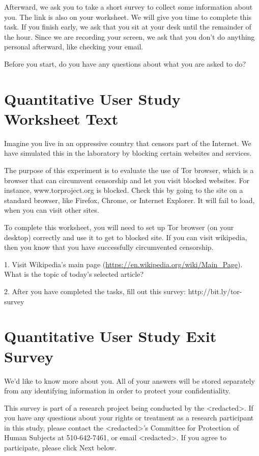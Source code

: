 \documentclass[USenglish,oneside,twocolumn]{article}
\begin{document}
Afterward, we ask you to take a short survey to collect some information about you. The link is also on your worksheet.
We will give you time to complete this task. If you finish early, we ask that you sit at your desk until the remainder of the hour. Since we are recording your screen, we ask that you don't do anything personal afterward, like checking your email.

Before you start, do you have any questions about what you are asked to do? 

\section{Quantitative User Study Worksheet Text} 
\label{summative-worksheet}
Imagine you live in an oppressive country that censors part of the Internet. We have simulated this in the laboratory by blocking certain websites and services.

The purpose of this experiment is to evaluate the use of Tor browser, which is a browser that can circumvent censorship and let you visit blocked websites. For instance, www.torproject.org is blocked. Check this by going to the site on a standard browser, like Firefox, Chrome, or Internet Explorer. It will fail to load, when you can visit other sites.

To complete this worksheet, you will need to set up Tor browser (on your desktop) correctly and use it to get to blocked site. If you can visit wikipedia, then you know that you have successfully circumvented censorship.

1. Visit Wikipedia’s main page (\url{https://en.wikipedia.org/wiki/Main\_Page}). What is the topic of today’s selected article? 

2. After you have completed the tasks, fill out this survey: http://bit.ly/tor-survey 


\section{Quantitative User Study Exit Survey} 
\label{quantitative-exit-survey}
We'd like to know more about you.  All of your answers will be stored separately from any identifying information in order to protect your confidentiality.

This survey is part of a research project being conducted by the <redacted>. %
If you have any questions about your rights or treatment as a research participant in this study, please contact the <redacted>'s %
Committee for Protection of Human Subjects at 510-642-7461, or email 
<redacted>. %
If you agree to participate, please click Next below.\\
\end{document}
